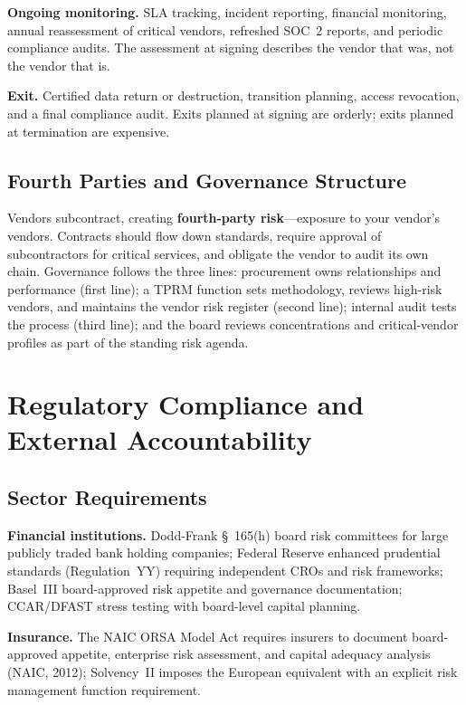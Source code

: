 \documentclass[11pt,openany]{book}
\begin{document}
\textbf{Ongoing monitoring.} SLA tracking, incident reporting, financial
monitoring, annual reassessment of critical vendors, refreshed SOC~2 reports,
and periodic compliance audits. The assessment at signing describes the
vendor that was, not the vendor that is.

\textbf{Exit.} Certified data return or destruction, transition planning,
access revocation, and a final compliance audit. Exits planned at signing are
orderly; exits planned at termination are expensive.

\subsection{Fourth Parties and Governance Structure}

Vendors subcontract, creating \textbf{fourth-party risk}---exposure to your
vendor's vendors. Contracts should flow down standards, require approval of
subcontractors for critical services, and obligate the vendor to audit its
own chain. Governance follows the three lines: procurement owns relationships
and performance (first line); a TPRM function sets methodology, reviews
high-risk vendors, and maintains the vendor risk register (second line);
internal audit tests the process (third line); and the board reviews
concentrations and critical-vendor profiles as part of the standing risk
agenda.

\section{Regulatory Compliance and External Accountability}
\label{sec:regulatory}

\subsection{Sector Requirements}

\textbf{Financial institutions.} Dodd-Frank \S~165(h) board risk committees
for large publicly traded bank holding companies; Federal Reserve enhanced
prudential standards (Regulation~YY) requiring independent CROs and risk
frameworks; Basel~III board-approved risk appetite and governance
documentation; CCAR/DFAST stress testing with board-level capital planning.

\textbf{Insurance.} The NAIC ORSA Model Act requires insurers to document
board-approved appetite, enterprise risk assessment, and capital adequacy
analysis (NAIC, 2012); Solvency~II imposes the European equivalent with an
explicit risk management function requirement.
\end{document}
